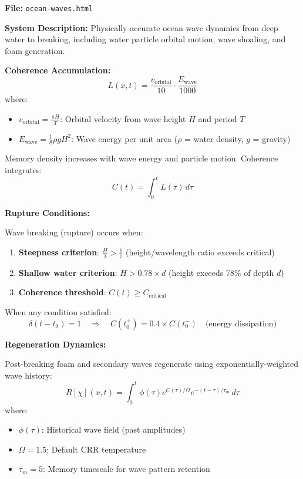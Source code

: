 \documentclass[11pt,a4paper]{article}
\theoremstyle{definition}
\theoremstyle{remark}
\begin{document}
\textbf{File:} \texttt{ocean-waves.html}

\textbf{System Description:} Physically accurate ocean wave dynamics from deep water to breaking, including water particle orbital motion, wave shoaling, and foam generation.

\textbf{Coherence Accumulation:}
\begin{equation}
L(x,t) = \frac{v_{\text{orbital}}}{10} \cdot \frac{E_{\text{wave}}}{1000}
\end{equation}
where:
\begin{itemize}
\item $v_{\text{orbital}} = \frac{\pi H}{T}$: Orbital velocity from wave height $H$ and period $T$
\item $E_{\text{wave}} = \frac{1}{8}\rho g H^2$: Wave energy per unit area ($\rho$ = water density, $g$ = gravity)
\end{itemize}

Memory density increases with wave energy and particle motion. Coherence integrates:
\begin{equation}
C(t) = \int_0^t L(\tau)\,d\tau
\end{equation}

\textbf{Rupture Conditions:}

Wave breaking (rupture) occurs when:
\begin{enumerate}
\item \textbf{Steepness criterion}: $\frac{H}{\lambda} > \frac{1}{7}$ (height/wavelength ratio exceeds critical)
\item \textbf{Shallow water criterion}: $H > 0.78 \times d$ (height exceeds 78\% of depth $d$)
\item \textbf{Coherence threshold}: $C(t) \geq C_{\text{critical}}$
\end{enumerate}

When any condition satisfied:
\begin{equation}
\delta(t-t_0) = 1 \quad \Rightarrow \quad C(t_0^+) = 0.4 \times C(t_0^-) \quad \text{(energy dissipation)}
\end{equation}

\textbf{Regeneration Dynamics:}

Post-breaking foam and secondary waves regenerate using exponentially-weighted wave history:
\begin{equation}
R[\chi](x,t) = \int_0^t \phi(\tau) e^{C(\tau)/\Omega} e^{-(t-\tau)/\tau_m}\,d\tau
\end{equation}
where:
\begin{itemize}
\item $\phi(\tau)$: Historical wave field (past amplitudes)
\item $\Omega = 1.5$: Default CRR temperature
\item $\tau_m = 5$: Memory timescale for wave pattern retention
\end{itemize}
\end{document}
